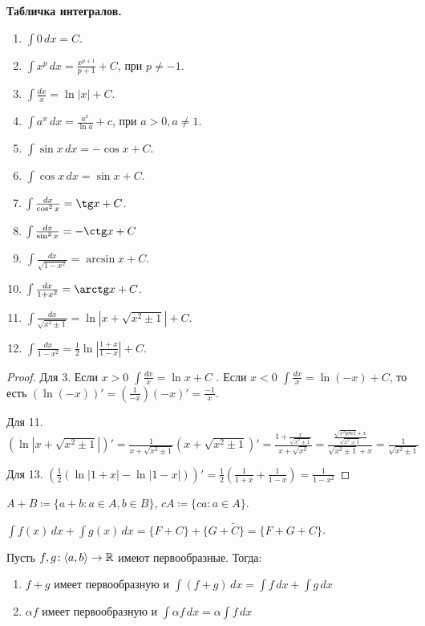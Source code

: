 \textbf{Табличка интегралов.}
\begin{enumerate}
    \item $\int 0\,dx = C$.
    \item $\int x^p\,dx = \frac{x^{p+1}}{p+1}+C$, при $p \neq -1$.
    \item  $\int \frac{dx}{x} = \ln |x| + C$.
    \item $\int a^x\,dx = \frac{a^x}{\ln a} + c$, при $a > 0, a \neq 1$.
    \item  $\int \sin x\,dx = - \cos x + C$.
    \item  $\int \cos x\,dx = \sin x + C$.
    \item $\int \frac{dx}{\cos^2 x} = \tg x + C$.
    \item $\int \frac{dx}{\sin^2 x} = -\ctg x + C$ 
    \item $\int \frac{dx}{\sqrt{1-x^2}} = \arcsin x + C$.
    \item $\int \frac{dx}{1+x^2} = \arctg x + C$.
    \item $\int \frac{dx}{\sqrt{x^2 \pm 1}} = \ln |x+\sqrt{x^2 \pm 1}| + C$. 
    \item $\int \frac{dx}{1-x^2} = \frac{1}{2} \ln |\frac{1+x}{1-x}| + C$.
\end{enumerate}
\begin{proof}
    Для 3. Если $x > 0$  $\int \frac{dx}{x} = \ln x + C$ . Если $x < 0$  $\int \frac{dx}{x} = \ln(-x) + C$, то есть $(\ln (-x))' = (\frac{1}{-x}) (-x)' = \frac{-1}{x}$.

    Для 11. $(\ln |x+\sqrt{x^2 \pm 1}|)' = \frac{1}{x + \sqrt{x^2 \pm 1}}(x + \sqrt{x^2 \pm 1})' = \frac{1 + \frac{x}{\sqrt{x^2 \pm 1}}}{x + \sqrt{x^2}} = \frac{\frac{\sqrt{x^2 pm 1} + x}{\sqrt{x^2 \pm 1}}}{\sqrt{x^2 \pm 1} + x} = \frac{1}{\sqrt{x^2 \pm 1}}$

    Для 13. $(\frac{1}{2}(\ln |1+x| - \ln |1-x|))' = \frac{1}{2}(\frac{1}{1+x} + \frac{1}{1-x}) = \frac{1}{1-x^2}$
\end{proof}
\begin{remark}
    $A + B \coloneqq \{a+b\!: a \in A, b \in B\}$,  $cA \coloneqq \{ca\!: a \in A\}$.

    $\int f(x)\,dx + \int g(x)\,dx = \{F+C\} + \{G+\widetilde{C}\} = \{F+G+C\}$.
\end{remark}
\begin{theorem}
    Пусть $f, g\!: \langle a, b \rangle \to \mathbb{R}$ имеют первообразные. Тогда:
     \begin{enumerate}
         \item $f+g$ имеет первообразную и  $\int (f+g)\,dx = \int f\,dx + \int g\,dx$
         \item $\alpha f$ имеет первообразную и  $\int \alpha f\,dx = \alpha \int f\,dx$
    \end{enumerate}
\end{theorem}
